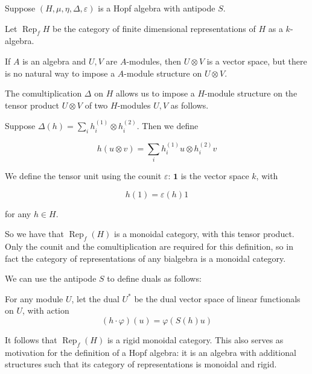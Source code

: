 \documentclass[]{article}
\newcommand{\Rep}{\operatorname{Rep}}
\numberwithin{equation}{subsection}
\begin{document}
Suppose $(H, \mu, \eta, \Delta, \varepsilon)$ is a Hopf algebra with antipode $S$. 

Let $\Rep_f H$ be the category of finite dimensional representations of $H$ as a $k$-algebra.

If $A$ is an algebra and $U, V$ are $A$-modules, then $U \otimes V$ is a vector
space, but there is no natural way to impose a $A$-module structure on $U
\otimes V$. 

The comultiplication $\Delta$ on $H$ allows us to impose a $H$-module structure
on the tensor product $U \otimes V$ of two $H$-modules $U,V$ as follows.

Suppose $\Delta(h) = \sum _{i} h^{(1)}_i \otimes h^{(2)}_i$. Then we define

\begin{equation}
    h (u \otimes v) = \sum_{i} h^{(1)}_i u \otimes h^{(2)}_i v
\end{equation}

We define the tensor unit using the counit $\varepsilon$: $\mathbf{1}$ is the vector space $k$, with 

\begin{equation}
    h(1) = \varepsilon(h) 1
\end{equation}

 for any $h\in H$.

So we have that $\Rep_f(H)$ is a monoidal category, with this tensor product.
Only the counit and the comultiplication are required for this definition, so
in fact the category of representations of any bialgebra is a monoidal
category.

We can use the antipode $S$ to define duals as follows:

For any module $U$, let the dual $U^*$ be the dual vector space of linear functionals on $U$, with action
\begin{equation}
    (h\cdot \varphi)(u)  = \varphi(S(h) u)
\end{equation}

It follows that $\Rep_f(H)$ is a rigid monoidal category. This also serves as
motivation for the definition of a Hopf algebra: it is an algebra with
additional structures such that its category of representations is monoidal and
rigid. 

\end{document}
